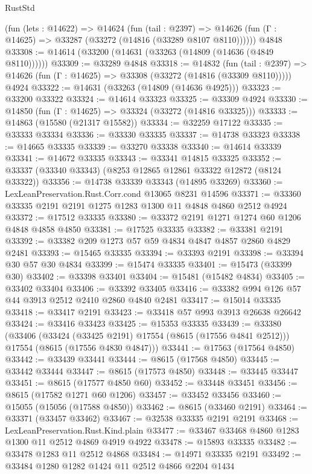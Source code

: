 \begin{lexlean}{RustStd}
\begin{coremodule}
    (fun (lets : @14622) =>
    @14624
      (fun (tail : @2397) =>
      @14626 (fun (Γ : @14625) => @33287 (@33272 (@14816 (@33289 @8107 @8110))))))
    @4848
@33308 := @14614 (@33200 (@14631 (@33263 (@14809 (@14636 (@4849 @8110))))))
@33309 := @33289 @4848
@33318 := @14832
    (fun (tail : @2397) => @14626 (fun (Γ : @14625) => @33308 (@33272 (@14816 (@33309 @8110)))))
    @4924
@33322 := @14631 (@33263 (@14809 (@14636 @4925)))
@33323 := @33200 @33322
@33324 := @14614 @33323
@33325 := @33309 @4924
@33330 := @14850 (fun (Γ : @14625) => @33324 (@33272 (@14816 @33325)))
@33333 := @14863 (@15580 (@21317 @15582))
@33334 := @32259 @17122
@33335 := @33333 @33334
@33336 := @33330 @33335
@33337 := @14738 @33323
@33338 := @14665 @33335
@33339 := @33270 @33338
@33340 := @14614 @33339
@33341 := @14672 @33335
@33343 := @33341 @14815 @33325
@33352 := @33337 (@33340 @33343) (@8253 @12865 @12861 @33322 @12872 (@8124 @33322))
@33356 := @14738 @33339 @33343 (@14895 @33269)
@33360 := LexLeanPreservation.Rust.Corr.cond @13065 @8231 @14596
@33371 := @33360 @33335 @2191 @2191 @1275 @1283 @1300 @11 @4848 @4860 @2512 @4924
@33372 := @17512 @33335
@33380 := @33372 @2191 @1271 @1274 @60 @1206 @4848 @4858 @4850
@33381 := @17525 @33335
@33382 := @33381 @2191
@33392 := @33382 @209 @1273 @57 @59 @4834 @4847 @4857 @2860 @4829 @2481
@33393 := @15465 @33335
@33394 := @33393 @2191
@33398 := @33394 @30 @57 @30 @4834
@33399 := @15474 @33335
@33401 := @15473 (@33399 @30)
@33402 := @33398 @33401
@33404 := @15481 (@15482 @4834)
@33405 := @33402 @33404
@33406 := @33392 @33405
@33416 := @33382 @994 @126 @57 @44 @3913 @2512 @2410 @2860 @4840 @2481
@33417 := @15014 @33335
@33418 := @33417 @2191
@33423 := @33418 @57 @993 @3913 @26638 @26642
@33424 := @33416 @33423
@33425 := @15353 @33335
@33439 := @33380
    (@33406
      (@33424 (@33425 @2191) @17554 (@8615 (@17556 @4841 @2512)))
      @17554
      (@8615 (@17556 @4830 @4847)))
@33441 := @17563 (@17564 @4850)
@33442 := @33439 @33441
@33444 := @8615 (@17568 @4850)
@33445 := @33442 @33444
@33447 := @8615 (@17573 @4850)
@33448 := @33445 @33447
@33451 := @8615 (@17577 @4850 @60)
@33452 := @33448 @33451
@33456 := @8615 (@17582 @1271 @60 @1206)
@33457 := @33452 @33456
@33460 := @15055 (@15056 (@17588 @4850))
@33462 := @8615 (@33460 @2191)
@33464 := @33371 (@33457 @33462)
@33467 := @32538 @33335 @2191 @2191
@33468 := LexLeanPreservation.Rust.Kind.plain
@33477 := @33467 @33468 @4860 @1283 @1300 @11 @2512 @4869 @4919 @4922
@33478 := @15893 @33335
@33482 := @33478 @1283 @11 @2512 @4868
@33484 := @14971 @33335 @2191
@33492 := @33484 @1280 @1282 @1424 @11 @2512 @4866 @2204 @1434

\end{coremodule}
\end{lexlean}
